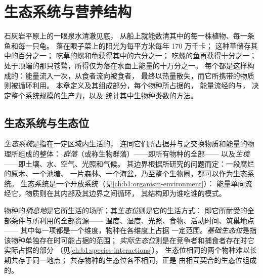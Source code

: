 \chapter{生态系统与营养结构}\label{ch:b1:ecosystem-organization}

石灰岩平原上的一眼泉水清澈见底，
从船上就能数清其中的每一株植物、每一条鱼和每一只龟。
落在眼子菜上的阳光为每平方米每年 170 万千卡；
这种草储存其中的百分之一；
吃草的螺和龟获得其中的六分之一；
吃螺的鱼再获得十分之一；
处于顶端的那只苍鹭，所得仅为落在水面上能量的十万分之一。
每个都是这样构成的：能量流入一次，从食者流向被食者，
最终以热量散失，而它所携带的物质则被循环利用。
本章定义及其组成部分，每个物种所占据的，
能量流经的与，
决定整个系统规模的生产力，以及
统计其中生物种类数的方法。

\section{生态系统与生态位}

\begin{definition}[生态系统、生境、群落]\label{def:b1:ecosystem-organization:ecosystem}
\emph{生态系统}是指在一定区域内生活的，
连同它们所占据并与之交换物质和能量的物理所组成的整体：
\emph{群落}（或称生物群落）——即所有物种的全部——
以及\emph{生境}——即土壤、水、空气、光照和气候。
其边界根据所研究的问题而定：一段腐烂的原木、一个池塘、
一片森林、一个海盆，乃至整个生物圈，都可以作为生态系统。
生态系统是一个开放系统（见\cref{ch:b1:organism-environment}）：
能量单向流经它，物质则在其内部及其边界之间循环，
其结构即为谁吃谁的模式。
\end{definition}

\begin{definition}\label{def:b1:ecosystem-organization:niche}
物种的\emph{栖息地}是它所生活的场所；其\emph{生态位}则是它的生活方式：
即它所耐受的全部条件与所利用的全部资源——
温度、湿度、光照、食物、活动时间、筑巢地点——
其中每一项都是一个维度，物种在各维度上占据
一定范围。\emph{基础生态位}是指该物种单独存在时可能占据的范围；
\emph{实际生态位}则是在竞争者和捕食者存在时它实际占据的部分
（见\cref{ch:b1:species-interactions}）。
生态位相同的两个物种难以长期共存于同一地点；
共存物种的生态位各不相同，正是
由相互契合的生态位组成的。
\end{definition}

